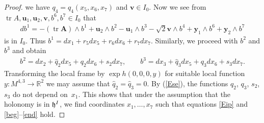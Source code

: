 \documentclass[11pt]{article}
\numberwithin{equation}{section}
\newcommand\fh{{\frak h}}
\newcommand\bA{{\mathbf A}}
\newcommand\bu{{\mathbf u}}
\newcommand\by{{\mathbf y}}
\newcommand\bv{{\mathbf v}}
\newcommand\RR{{\mathbb R}}
\newcommand{\tr}{\operatorname{tr}}
\begin{document}
\begin{proof}
we have $q_4=q_4(x_5,x_6,x_7)$ and $\bv\in I_0$. Now we see from $\tr A, \bu_1, \bu_2, \bv, b^6, b^7 \in I_0$ that
\begin{gather*}db^1=-(\tr \bA)\wedge b^1 +\bu_2\wedge b^2-\bu_1\wedge b^3-\sqrt 2 \bv\wedge b^4+\by_1\wedge b^6 +\by_2\wedge b^7\end{gather*}
is in $I_0$. Thus $b^1=dx_1+ r_5 dx_5+ r_6 dx_6+r_7dx_7$. Similarly, we proceed with $b^2$ and $b^3$ and obtain
\begin{gather*}b^2=dx_2+\hat q_2dx_5+q_2 dx_6+s_2dx_7, \qquad b^3=dx_3+\hat q_3 dx_5 +q_3 dx_6+s_3dx_7.\end{gather*}
Transforming the local frame by $\exp h(0,0,0,y)$ for suitable local function $y\colon M^{4,3}\to \RR^2$ we may assume that $\hat q_{2}=\hat q_{3}=0$. By (\ref{Ese}), the functions $q_2$, $q_3$, $s_2$, $s_3$ do not depend on~$x_1$. This shows that under the assumption that the holonomy is in $\fh^I$, we find coordinates $x_1,\dots,x_7$ such that equations \eqref{Eip} and \eqref{beg}--\eqref{end} hold.


\end{proof}
\end{document}
